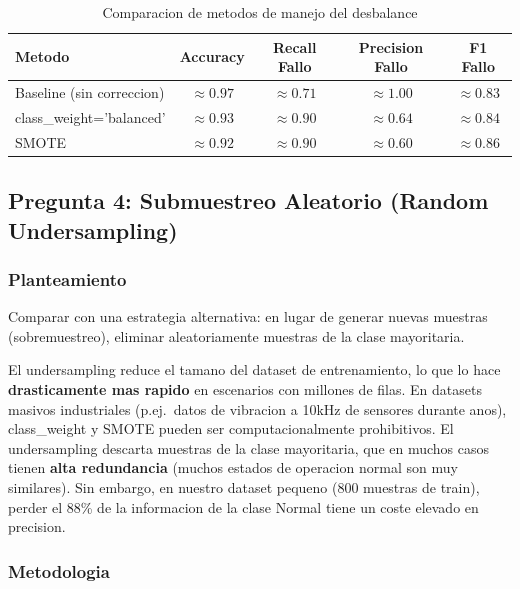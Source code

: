 \documentclass[12pt,a4paper]{article}
\begin{document}
\begin{table}[H]
  \centering
  \caption{Comparacion de metodos de manejo del desbalance}
  \label{tab:imbalance_comparison}
  \begin{tabular}{lcccc}
    \toprule
    \textbf{Metodo} & \textbf{Accuracy} & \textbf{Recall Fallo} & \textbf{Precision Fallo} & \textbf{F1 Fallo} \\
    \midrule
    Baseline (sin correccion) & $\approx 0.97$ & $\approx 0.71$ & $\approx 1.00$ & $\approx 0.83$ \\
    class\_weight='balanced'  & $\approx 0.93$ & $\approx 0.90$ & $\approx 0.64$ & $\approx 0.84$ \\
    SMOTE                     & $\approx 0.92$ & $\approx 0.90$ & $\approx 0.60$ & $\approx 0.86$ \\
    \bottomrule
  \end{tabular}
\end{table}

\subsection{Pregunta 4: Submuestreo Aleatorio (Random Undersampling)}

\subsubsection*{Planteamiento}
Comparar con una estrategia alternativa: en lugar de generar nuevas muestras (sobremuestreo),
eliminar aleatoriamente muestras de la clase mayoritaria.

\begin{tcolorbox}[porquebox, title={Por que probar undersampling si ya tenemos class\_weight y SMOTE?}]
El undersampling reduce el tamano del dataset de entrenamiento, lo que lo hace \textbf{drasticamente
mas rapido} en escenarios con millones de filas. En datasets masivos industriales (p.ej.\ datos
de vibracion a 10kHz de sensores durante anos), class\_weight y SMOTE pueden ser computacionalmente
prohibitivos. El undersampling descarta muestras de la clase mayoritaria, que en muchos casos
tienen \textbf{alta redundancia} (muchos estados de operacion normal son muy similares). Sin
embargo, en nuestro dataset pequeno (800 muestras de train), perder el 88\% de la informacion
de la clase Normal tiene un coste elevado en precision.
\end{tcolorbox}

\subsubsection*{Metodologia}
\end{document}

